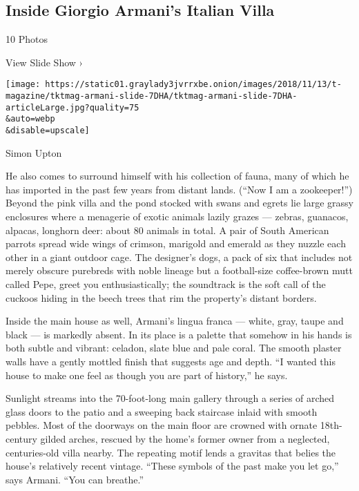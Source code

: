 \href{https://www.nytimes3xbfgragh.onion/slideshow/2018/11/19/t-magazine/inside-giorgio-armanis-italian-villa.html}{}

\hypertarget{inside-giorgio-armanis-italian-villa}{%
\subsection{Inside Giorgio Armani's Italian
Villa}\label{inside-giorgio-armanis-italian-villa}}

10 Photos

View Slide Show ›

\texttt{[image: https://static01.graylady3jvrrxbe.onion/images/2018/11/13/t-magazine/tktmag-armani-slide-7DHA/tktmag-armani-slide-7DHA-articleLarge.jpg?quality=75\\\&auto=webp\\\&disable=upscale]}

Simon Upton

He also comes to surround himself with his collection of fauna, many of
which he has imported in the past few years from distant lands. (``Now I
am a zookeeper!'') Beyond the pink villa and the pond stocked with swans
and egrets lie large grassy enclosures where a menagerie of exotic
animals lazily grazes --- zebras, guanacos, alpacas, longhorn deer:
about 80 animals in total. A pair of South American parrots spread wide
wings of crimson, marigold and emerald as they nuzzle each other in a
giant outdoor cage. The designer's dogs, a pack of six that includes not
merely obscure purebreds with noble lineage but a football-size
coffee-brown mutt called Pepe, greet you enthusiastically; the
soundtrack is the soft call of the cuckoos hiding in the beech trees
that rim the property's distant borders.

Inside the main house as well, Armani's lingua franca --- white, gray,
taupe and black --- is markedly absent. In its place is a palette that
somehow in his hands is both subtle and vibrant: celadon, slate blue and
pale coral. The smooth plaster walls have a gently mottled finish that
suggests age and depth. ``I wanted this house to make one feel as though
you are part of history,'' he says.

Sunlight streams into the 70-foot-long main gallery through a series of
arched glass doors to the patio and a sweeping back staircase inlaid
with smooth pebbles. Most of the doorways on the main floor are crowned
with ornate 18th-century gilded arches, rescued by the home's former
owner from a neglected, centuries-old villa nearby. The repeating motif
lends a gravitas that belies the house's relatively recent vintage.
``These symbols of the past make you let go,'' says Armani. ``You can
breathe.''

